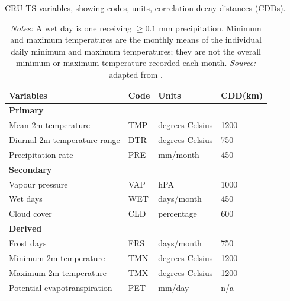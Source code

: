 \documentclass[a4paper,12pt]{article}
\theoremstyle{plain}
\theoremstyle{definition}
\theoremstyle{definition}
\theoremstyle{definition}
\theoremstyle{definition}
\begin{document}
\begin{table}[t!]
    \singlespacing
    \centering
    \caption{CRU TS variables, showing codes, units, correlation decay distances (CDDs).}
    \caption*{\footnotesize{\textit{Notes:} A wet day is one receiving $\geq 0.1$ mm precipitation. Minimum and maximum temperatures are the monthly means of the individual daily minimum and maximum temperatures; they are not the overall minimum or maximum temperature recorded each month. \textit{Source:} adapted from \citet{harris2020}.}}
    \begin{tabular}{|p{6cm}|p{1cm}|p{3cm}|p{2cm}| }
    \hline
    \raggedright\textbf{Variables} & \textbf{Code} & \textbf{Units} & \textbf{CDD(km)} \\
    \hline    
    \textbf{Primary} & \ \ & \ \ & \ \ \\
    \quad Mean 2m temperature & TMP & degrees Celsius & 1200\\
    \quad Diurnal 2m temperature range & DTR & degrees Celsius & 750 \\
    \quad Precipitation rate & PRE & mm/month & 450 \\
    \textbf{Secondary} & \ \ & \ \ & \ \ \\
    \quad Vapour pressure & VAP & hPA & 1000 \\
    \quad Wet days & WET & days/month & 450 \\
    \quad Cloud cover & CLD & percentage & 600 \\
    \textbf{Derived} & \ \ & \ \ & \ \ \\
    \quad Frost days &FRS& days/month & 750 \\
    \quad Minimum 2m temperature &TMN& degrees Celsius & 1200 \\
    \quad Maximum 2m temperature &TMX& degrees Celsius & 1200 \\
    \quad Potential evapotranspiration &PET& mm/day & n/a \\
    \hline
    \end{tabular}
    \label{tab:cruvars}
\end{table}
\end{document}

